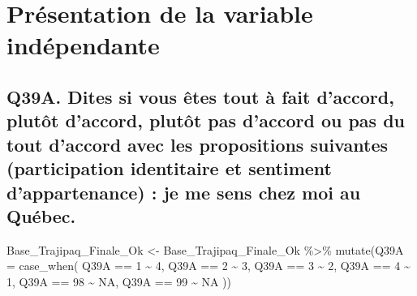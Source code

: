 \documentclass[
]{article}
\newenvironment{Shaded}{\begin{snugshade}}{\end{snugshade}}
\newcommand{\AttributeTok}[1]{\textcolor[rgb]{0.77,0.63,0.00}{#1}}
\newcommand{\ConstantTok}[1]{\textcolor[rgb]{0.00,0.00,0.00}{#1}}
\newcommand{\DecValTok}[1]{\textcolor[rgb]{0.00,0.00,0.81}{#1}}
\newcommand{\FunctionTok}[1]{\textcolor[rgb]{0.00,0.00,0.00}{#1}}
\newcommand{\NormalTok}[1]{#1}
\newcommand{\OtherTok}[1]{\textcolor[rgb]{0.56,0.35,0.01}{#1}}
\newcommand{\SpecialCharTok}[1]{\textcolor[rgb]{0.00,0.00,0.00}{#1}}
\begin{document}
\hypertarget{pruxe9sentation-de-la-variable-induxe9pendante}{%
\section{Présentation de la variable
indépendante}\label{pruxe9sentation-de-la-variable-induxe9pendante}}

\hypertarget{q39a.-dites-si-vous-uxeates-tout-uxe0-fait-daccord-plutuxf4t-daccord-plutuxf4t-pas-daccord-ou-pas-du-tout-daccord-avec-les-propositions-suivantes-participation-identitaire-et-sentiment-dappartenance-je-me-sens-chez-moi-au-quuxe9bec.}{%
\subsection{Q39A. Dites si vous êtes tout à fait d'accord, plutôt
d'accord, plutôt pas d'accord ou pas du tout d'accord avec les
propositions suivantes (participation identitaire et sentiment
d'appartenance) : je me sens chez moi au
Québec.}\label{q39a.-dites-si-vous-uxeates-tout-uxe0-fait-daccord-plutuxf4t-daccord-plutuxf4t-pas-daccord-ou-pas-du-tout-daccord-avec-les-propositions-suivantes-participation-identitaire-et-sentiment-dappartenance-je-me-sens-chez-moi-au-quuxe9bec.}}

\begin{Shaded}
\begin{Highlighting}[]
\NormalTok{Base\_Trajipaq\_Finale\_Ok }\OtherTok{\textless{}{-}}
\NormalTok{  Base\_Trajipaq\_Finale\_Ok }\SpecialCharTok{\%\textgreater{}\%}
  \FunctionTok{mutate}\NormalTok{(}\AttributeTok{Q39A =} \FunctionTok{case\_when}\NormalTok{(}
\NormalTok{    Q39A }\SpecialCharTok{==} \DecValTok{1} \SpecialCharTok{\textasciitilde{}} \DecValTok{4}\NormalTok{,}
\NormalTok{    Q39A }\SpecialCharTok{==} \DecValTok{2} \SpecialCharTok{\textasciitilde{}} \DecValTok{3}\NormalTok{,}
\NormalTok{    Q39A }\SpecialCharTok{==} \DecValTok{3} \SpecialCharTok{\textasciitilde{}} \DecValTok{2}\NormalTok{,}
\NormalTok{    Q39A }\SpecialCharTok{==} \DecValTok{4} \SpecialCharTok{\textasciitilde{}} \DecValTok{1}\NormalTok{,}
\NormalTok{    Q39A }\SpecialCharTok{==} \DecValTok{98} \SpecialCharTok{\textasciitilde{}} \ConstantTok{NA}\NormalTok{,}
\NormalTok{    Q39A }\SpecialCharTok{==} \DecValTok{99} \SpecialCharTok{\textasciitilde{}} \ConstantTok{NA}
\NormalTok{  ))}
\end{Highlighting}
\end{Shaded}

\begin{Shaded}
\end{Shaded}
\end{document}
